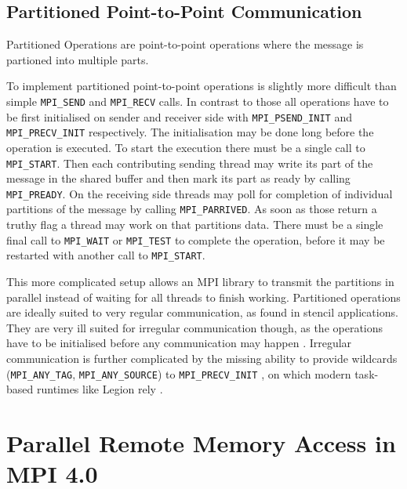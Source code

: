 \documentclass[sigconf]{acmart}
\begin{document}
\subsection{Partitioned Point-to-Point Communication}


Partitioned Operations are point-to-point operations where the message is partioned into multiple parts.

To implement partitioned point-to-point operations is slightly more difficult than simple \verb|MPI_SEND| and \verb|MPI_RECV| calls.
In contrast to those all operations have to be first initialised on sender and receiver side with \verb|MPI_PSEND_INIT| and \verb|MPI_PRECV_INIT| respectively.
The initialisation may be done long before the operation is executed.
To start the execution there must be a single call to \verb|MPI_START|.
Then each contributing sending thread may write its part of the message in the shared buffer and then mark its part as ready by calling \verb|MPI_PREADY|.
On the receiving side threads may poll for completion of individual partitions of the message by calling \verb|MPI_PARRIVED|.
As soon as those return a truthy flag a thread may work on that partitions data.
There must be a single final call to \verb|MPI_WAIT| or \verb|MPI_TEST| to complete the operation, before it may be restarted with another call to \verb|MPI_START|.

This more complicated setup allows an MPI library to transmit the partitions in parallel instead of waiting for all threads to finish working.
Partitioned operations are ideally suited to very regular communication, as found in stencil applications.
They are very ill suited for irregular communication though, as the operations have to be initialised before any communication may happen \cite{zambreLessonsLearned2022}.
Irregular communication is further complicated by the missing ability to provide wildcards (\verb|MPI_ANY_TAG|, \verb|MPI_ANY_SOURCE|) to \verb|MPI_PRECV_INIT| \cite{mpi40}, on which modern task-based runtimes like Legion rely \cite{zambreLessonsLearned2022}.


\section{Parallel Remote Memory Access in MPI 4.0}
\end{document}
